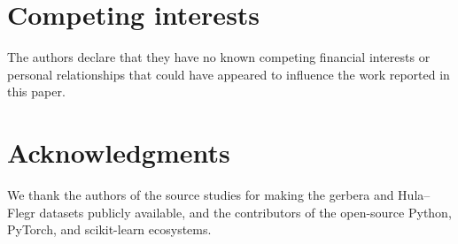 \documentclass[10pt,letterpaper]{article}
\begin{document}
\section*{Competing interests}
The authors declare that they have no known competing financial interests or personal relationships that could have appeared to influence the work reported in this paper.


\section*{Acknowledgments}
We thank the authors of the source studies for making the gerbera and Hula--Flegr datasets publicly available, and the contributors of the open-source Python, PyTorch, and scikit-learn ecosystems.


\nolinenumbers

\end{document}
